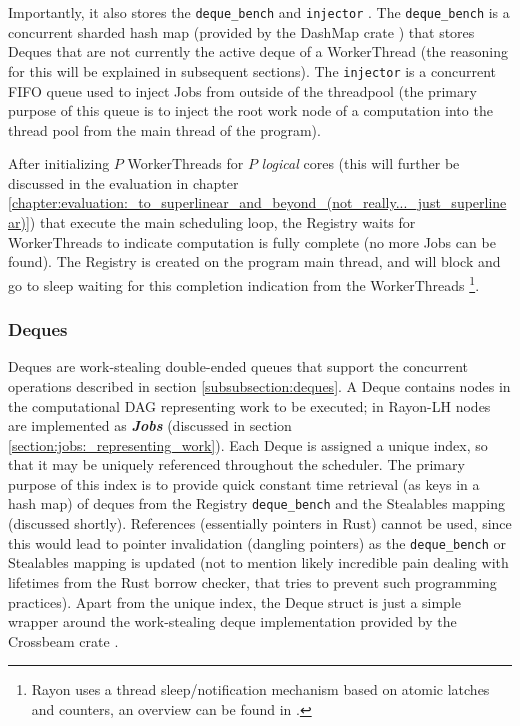 \documentclass[bsc,frontabs,singlespacing,parskip,deptreport,normalheadings]{infthesis}
\begin{document}
Importantly, it also stores the \texttt{deque\_bench}
and \texttt{injector} . The \texttt{deque\_bench} is a concurrent sharded hash
map (provided by the DashMap crate \cite{joel_dashmap_2022}) that stores Deques
that are not currently the active deque of a WorkerThread (the reasoning for
this will be explained in subsequent sections). The \texttt{injector} is a
concurrent FIFO queue used to inject Jobs from outside of the threadpool (the
primary purpose of this queue is to inject the root work node of a computation
into the thread pool from the main thread of the program).

After initializing \(P\) WorkerThreads for \(P\) \textit{logical} cores (this
will further be discussed in the evaluation in chapter
\ref{chapter:evaluation:_to_superlinear_and_beyond_(not_really..._just_superlinear)})
that execute the main scheduling loop, the Registry waits for WorkerThreads to
indicate computation is fully complete (no more Jobs can be found). The Registry
is created on the program main thread, and will block and go to sleep waiting
for this completion indication from the WorkerThreads \footnote{Rayon uses a
thread sleep/notification mechanism based on atomic latches and counters, an
overview can be found in \cite{noauthor_rayon-sleep_2022}.}.

\subsubsection*{Deques}
\label{subsubsection:deque_component}

Deques are work-stealing double-ended queues that support the concurrent
operations described in section \ref{subsubsection:deques}. A Deque contains
nodes in the computational DAG representing work to be executed; in Rayon-LH
nodes are implemented as \textit{\textbf{Jobs}} (discussed in section
\ref{section:jobs:_representing_work}). Each Deque is assigned a unique index,
so that it may be uniquely referenced throughout the scheduler. The primary
purpose of this index is to provide quick constant time retrieval (as keys in a
hash map) of deques from the Registry \texttt{deque\_bench} and the Stealables
mapping (discussed shortly). References (essentially pointers in Rust) cannot be
used, since this would lead to pointer invalidation (dangling pointers) as the
\texttt{deque\_bench} or Stealables mapping is updated (not to mention likely
incredible pain dealing with lifetimes from the Rust borrow checker, that tries
to prevent such programming practices). Apart from the unique index, the Deque
struct is just a simple wrapper around the work-stealing deque implementation
provided by the Crossbeam crate \cite{noauthor_crossbeam_2022}.
\end{document}
